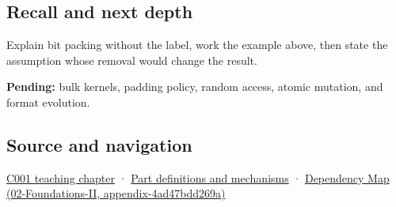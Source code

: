 \subsection{Recall and next depth}\label{recall-and-next-depth}

Explain bit packing without the label, work the example above, then state the assumption whose removal would change the result.

\textbf{Pending:} bulk kernels, padding policy, random access, atomic mutation, and format evolution.

\subsection{Source and navigation}\label{source-and-navigation}

\href{Continuous\%20Notes/Computing\%20Foundations\%20-\%20From\%20Bits\%20to\%20C++\%20and\%20Systems\%20APIs\#From\%20a\%20signal\%20to\%20an\%20interpretation}{C001 teaching chapter} · \hyperref[appendix-fd090d982a15]{Part definitions and mechanisms} · \href{}{Dependency Map (02-Foundations-II, appendix-4ad47bdd269a)}
